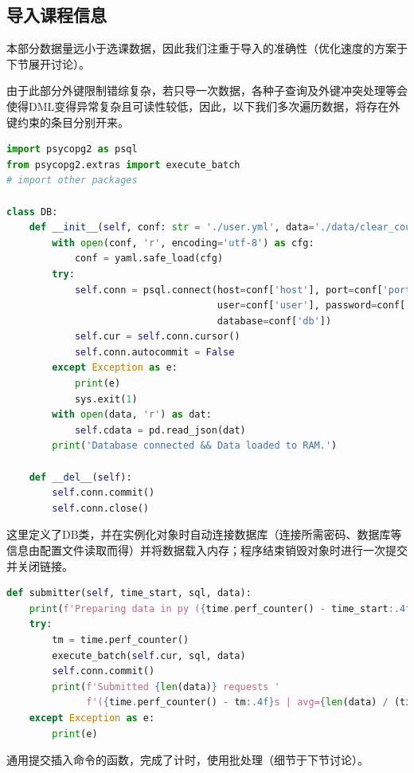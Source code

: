 \subsection{导入课程信息}
本部分数据量远小于选课数据，因此我们注重于导入的准确性（优化速度的方案于下节展开讨论）。
\par 由于此部分外键限制错综复杂，若只导一次数据，各种子查询及外键冲突处理等会使得DML变得异常复杂且可读性较低，因此，以下我们多次遍历数据，将存在外键约束的条目分别开来。
\begin{lstlisting}[language=python]
import psycopg2 as psql
from psycopg2.extras import execute_batch
# import other packages

class DB:
    def __init__(self, conf: str = './user.yml', data='./data/clear_course_info.json'):
        with open(conf, 'r', encoding='utf-8') as cfg:
            conf = yaml.safe_load(cfg)
        try:
            self.conn = psql.connect(host=conf['host'], port=conf['port'],
                                     user=conf['user'], password=conf['pwd'],
                                     database=conf['db'])
            self.cur = self.conn.cursor()
            self.conn.autocommit = False
        except Exception as e:
            print(e)
            sys.exit(1)
        with open(data, 'r') as dat:
            self.cdata = pd.read_json(dat)
        print('Database connected && Data loaded to RAM.')

    def __del__(self):
        self.conn.commit()
        self.conn.close()
\end{lstlisting}
\vspace{-3em}\par
这里定义了DB类，并在实例化对象时自动连接数据库（连接所需密码、数据库等信息由配置文件读取而得）并将数据载入内存；程序结束销毁对象时进行一次提交并关闭链接。

\begin{lstlisting}[language=python]
def submitter(self, time_start, sql, data):
    print(f'Preparing data in py ({time.perf_counter() - time_start:.4f}s)', end=' >>> ')
    try:
        tm = time.perf_counter()
        execute_batch(self.cur, sql, data)
        self.conn.commit()
        print(f'Submitted {len(data)} requests '
              f'({time.perf_counter() - tm:.4f}s | avg={len(data) / (time.perf_counter() - tm):.4f}i/s)')
    except Exception as e:
        print(e)
\end{lstlisting}
\vspace{-3em}\par
通用提交插入命令的函数，完成了计时，使用批处理（细节于下节讨论）。

